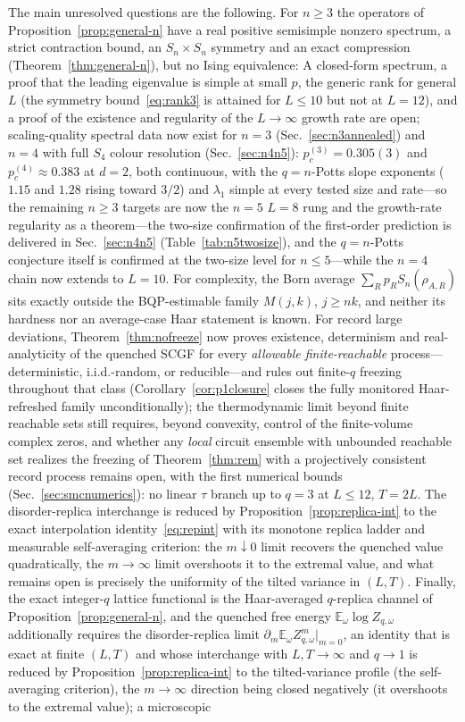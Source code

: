\documentclass[aps,prx,reprint,superscriptaddress,nobibnotes,longbibliography]{revtex4-2}
\theoremstyle{remark}
\newcommand{\E}{\mathbb E}
\begin{document}
The main unresolved questions are the following.  For $n\ge3$ the operators of Proposition~\ref{prop:general-n} have a real positive semisimple nonzero spectrum, a strict contraction bound, an $S_n\times S_n$ symmetry and an exact compression (Theorem~\ref{thm:general-n}), but no Ising equivalence: A closed-form spectrum, a proof that the leading eigenvalue is simple at small $p$, the generic rank for general $L$ (the symmetry bound~\eqref{eq:rank3} is attained for $L\le10$ but not at $L=12$), and a proof of the existence and regularity of the $L\to\infty$ growth rate are open; scaling-quality spectral data now exist for $n=3$ (Sec.~\ref{sec:n3annealed}) and $n=4$ with full $S_4$ colour resolution (Sec.~\ref{sec:n4n5}): $p_c^{(3)}=0.305(3)$ and $p_c^{(4)}\approx0.383$ at $d=2$, both continuous, with the $q=n$-Potts slope exponents ($1.15$ and $1.28$ rising toward $3/2$) and $\lambda_1$ simple at every tested size and rate—so the remaining $n\ge3$ targets are now the $n=5$ $L=8$ rung and the growth-rate regularity as a theorem---the two-size confirmation of the first-order prediction is delivered in Sec.~\ref{sec:n4n5} (Table~\ref{tab:n5twosize}), and the $q=n$-Potts conjecture itself is confirmed at the two-size level for $n\le5$---while the $n=4$ chain now extends to $L=10$.  For complexity, the Born average $\sum_Rp_RS_n(\rho_{A,R})$ sits exactly outside the BQP-estimable family $M(j,k)$, $j\ge nk$, and neither its hardness nor an average-case Haar statement is known.  For record large deviations, Theorem~\ref{thm:nofreeze} now proves existence, determinism and real-analyticity of the quenched SCGF for every \emph{allowable finite-reachable} process---deterministic, i.i.d.-random, or reducible---and rules out finite-$q$ freezing throughout that class (Corollary~\ref{cor:p1closure} closes the fully monitored Haar-refreshed family unconditionally); the thermodynamic limit beyond finite reachable sets still requires, beyond convexity, control of the finite-volume complex zeros, and whether any \emph{local} circuit ensemble with unbounded reachable set realizes the freezing of Theorem~\ref{thm:rem} with a projectively consistent record process remains open, with the first numerical bounds (Sec.~\ref{sec:smcnumerics}): no linear $\tau$ branch up to $q=3$ at $L\le12$, $T=2L$.  The disorder-replica interchange is reduced by Proposition~\ref{prop:replica-int} to the exact interpolation identity~\eqref{eq:repint} with its monotone replica ladder and measurable self-averaging criterion: the $m\downarrow0$ limit recovers the quenched value quadratically, the $m\to\infty$ limit overshoots it to the extremal value, and what remains open is precisely the uniformity of the tilted variance in $(L,T)$.  Finally, the exact integer-$q$ lattice functional is the Haar-averaged $q$-replica channel of Proposition~\ref{prop:general-n}, and the quenched free energy $\E_\omega\log Z_{q,\omega}$ additionally requires the disorder-replica limit $\partial_m\E_\omega Z_{q,\omega}^m|_{m=0}$, an identity that is exact at finite $(L,T)$ and whose interchange with $L,T\to\infty$ and $q\to1$ is reduced by Proposition~\ref{prop:replica-int} to the tilted-variance profile (the self-averaging criterion), the $m\to\infty$ direction being closed negatively (it overshoots to the extremal value); a microscopic 
\end{document}
